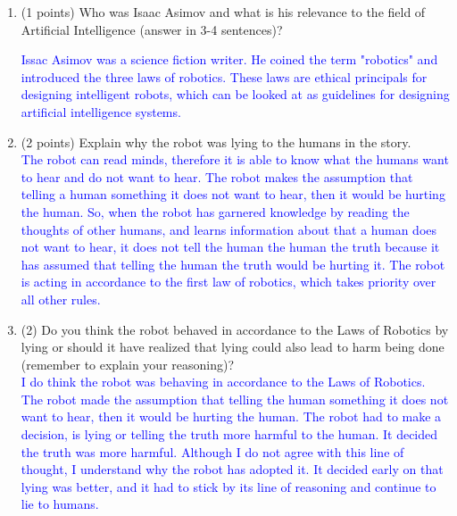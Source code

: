 \documentclass[12pt]{article}
\newenvironment{qparts}{\begin{enumerate}[{(}a{)}]}{\end{enumerate}}
\begin{document}
\begin{qparts}
  \item (1 points) Who was Isaac Asimov and what is his relevance to the field of Artificial Intelligence (answer in 3-4 sentences)?

  \textcolor{blue}{Issac Asimov was a science fiction writer. He coined the term "robotics" and introduced the three laws of robotics. These laws are ethical principals for designing intelligent robots, which can be looked at as guidelines for designing artificial intelligence systems.}
  \vspace{3cm}

  \item (2 points) Explain why the robot was lying to the humans in the story.\\

  \textcolor{blue}{The robot can read minds, therefore it is able to know what the humans want to hear and do not want to hear. The robot makes the assumption that telling a human something it does not want to hear, then it would be hurting the human. So, when the robot has garnered knowledge by reading the thoughts of other humans, and learns information about that a human does not want to hear, it does not tell the human the human the truth because it has assumed that telling the human the truth would be hurting it. The robot is acting in accordance to the first law of robotics, which takes priority over all other rules.}

  \vspace{1cm}

  \item (2) Do you think the robot behaved in accordance to the Laws of Robotics by lying or should it have realized that lying could also lead to harm being done (remember to explain your reasoning)?\\

  \textcolor{blue}{I do think the robot was behaving in accordance to the Laws of Robotics. The robot made the assumption that telling the human something it does not want to hear, then it would be hurting the human. The robot had to make a decision, is lying or telling the truth more harmful to the human. It decided the truth was more harmful. Although I do not agree with this line of thought, I understand why the robot has adopted it. It decided early on that lying was better, and it had to stick by its line of reasoning and continue to lie to humans.}

  \vspace{1cm}


\end{qparts}
\end{document}
